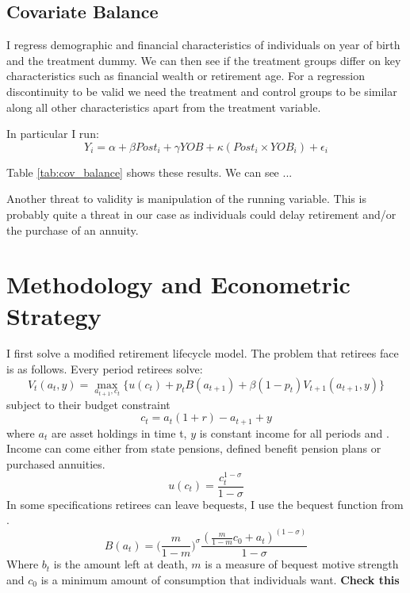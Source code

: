 \documentclass[12pt]{article}
\begin{document}
\subsection{Covariate Balance}

I regress demographic and financial characteristics of individuals on year of birth and the treatment dummy.
We can then see if the treatment groups differ on key characteristics such as financial wealth or retirement age.
For a regression discontinuity to be valid we need the treatment and control groups to be similar along
all other characteristics apart from the treatment variable.

In particular I run:
\begin{equation*}
  Y_{i} = \alpha + \beta Post_{i} + \gamma YOB + \kappa (Post_{i} \times YOB_{i}) + \epsilon_{i}
\end{equation*}


Table \ref{tab:cov_balance} shows these results. We can see ...


Another threat to validity is manipulation of the running variable. This is probably quite a threat in our case
as individuals could delay retirement and/or the purchase of an annuity.


\section{Methodology and Econometric Strategy}

I first solve a modified retirement lifecycle model. The problem that retirees face is as follows.
Every period retirees solve:
\begin{equation*}
  V_{t}(a_{t}, y) = \underset{a_{t+1}, c_{t}}{\max} \{ u(c_{t}) + p_{t}B(a_{t+1}) + \beta(1-p_{t})V_{t+1}(a_{t+1}, y) \}
\end{equation*}
subject to their budget constraint
\begin{equation*}
  c_{t} =a_{
  t}(1 +r) -  a_{t+1} + y
\end{equation*}
where $a_{t}$ are asset holdings in time t, $y$ is constant income for all periods and . Income can come either
from state pensions, defined benefit pension plans or purchased annuities.
\begin{equation*}
  u(c_{t}) = \frac{c_{t}^{1 - \sigma}}{1 - \sigma}
\end{equation*} In some specifications retirees can leave bequests, I use the bequest function from
\cite{lockwood_red_2012}.
\begin{equation*}
  B(a_{t}) = \bigl( \frac{m}{1 - m} \bigr)^{\sigma}  \frac{(\frac{m}{1 - m}c_{0} + a_{t})^{(1 - \sigma)}}{1 - \sigma}
\end{equation*}
Where $b_{t}$ is the amount left at death, $m$ is a measure of bequest motive strength and $c_{0}$ is
a minimum amount of consumption that individuals want. \textbf{Check this}
\end{document}
